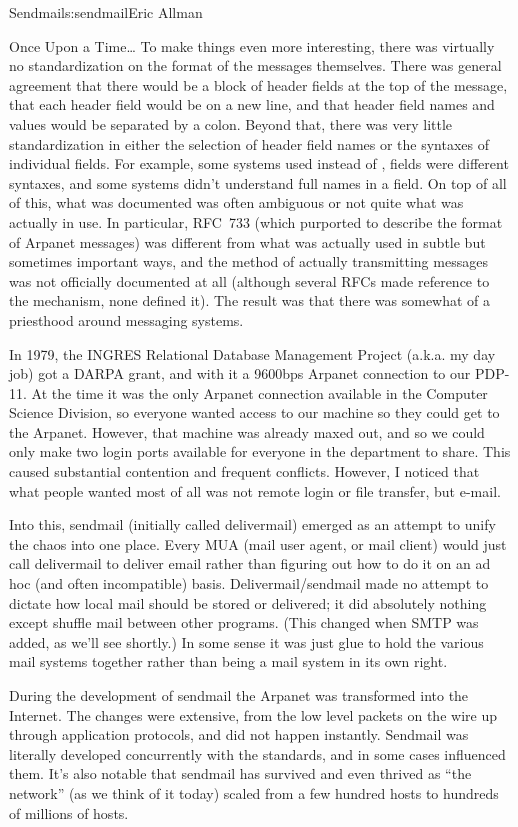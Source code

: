 \begin{aosachapter}{Sendmail}{s:sendmail}{Eric Allman}
\begin{aosasect1}{Once Upon a Time\ldots}
To make things even more interesting, there was virtually no
standardization on the format of the messages themselves.  There was
general agreement that there would be a block of header fields at the
top of the message, that each header field would be on a new line, and
that header field names and values would be separated by a
colon. Beyond that, there was very little standardization in either the
selection of header field names or the syntaxes of individual
fields. For example, some systems used  instead of
,  fields were different syntaxes, and some
systems didn't understand full names in a  field. On top
of all of this, what was documented was often ambiguous or not quite
what was actually in use. In particular, RFC~733 (which purported to
describe the format of Arpanet messages) was different from what was
actually used in subtle but sometimes important ways, and the method
of actually transmitting messages was not officially documented at all
(although several RFCs made reference to the mechanism, none defined
it). The result was that there was somewhat of a priesthood around
messaging systems.

In 1979, the INGRES Relational Database Management Project
(a.k.a. my day job)
got a DARPA grant, and with it a 9600bps Arpanet connection
to our PDP-11.
At the time it was the only Arpanet connection available in
the Computer Science Division,
so everyone wanted access to our machine so they could get to the Arpanet.
However, that machine was already maxed out,
and so we could only make two login ports available for everyone in the
department to share.
This caused substantial contention and frequent conflicts.
However, I noticed that what people wanted most of all was not
remote login or file transfer, but e-mail.

Into this, sendmail (initially called delivermail) emerged as an
attempt to unify the chaos into one place. Every MUA (mail user agent,
or mail client) would just call delivermail to deliver email rather than
figuring out how to do it on an ad hoc (and often incompatible) basis.
Delivermail/sendmail made no attempt to dictate how local mail should be stored or
delivered; it did absolutely nothing except shuffle mail between other
programs. (This changed when SMTP was added, as we'll see shortly.)
In some sense it was just glue to hold the various mail systems
together rather than being a mail system in its own right.

\pagebreak

During the development of sendmail the Arpanet was transformed into
the Internet. The changes were extensive, from the low level packets
on the wire up through application protocols, and did not happen
instantly.  Sendmail was literally developed concurrently with the
standards, and in some cases influenced them. It's also notable that
sendmail has survived and even thrived as ``the network'' (as we think
of it today) scaled from a few hundred hosts to hundreds of millions
of hosts.


\end{aosasect1}
\end{aosachapter}

